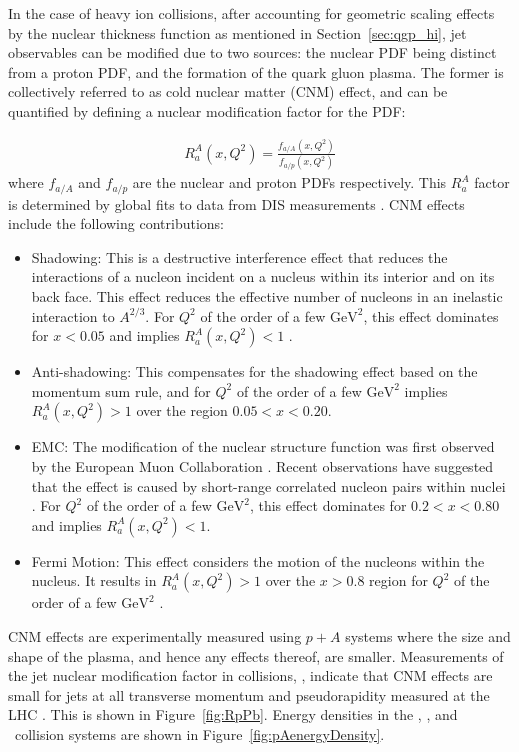 In the case of heavy ion collisions, after accounting for geometric scaling effects by the nuclear thickness function as mentioned in Section~\ref{sec:qgp_hi},  jet observables can be modified due to two sources: the nuclear PDF being distinct from a proton PDF, and the formation of the quark gluon plasma.
The former is collectively referred to as cold nuclear matter (CNM) effect, and can be quantified by defining a nuclear modification factor for the PDF:

\begin{align}
R_a^A (x, Q^2) = \frac{f_{a/A} (x, Q^2)}{f_{a/p}(x, Q^2)}
\end{align}
where $f_{a/A}$ and $f_{a/p}$ are the nuclear and proton PDFs respectively.
This $R_a^A$ factor is determined by global fits to data from DIS measurements \cite{PhysRevC.76.065207, PhysRevD.69.074028, Eskola_2009}.
CNM effects include the following contributions:
\begin{itemize}
\item Shadowing: This is a destructive interference effect that reduces the interactions of a nucleon incident on a nucleus within its interior and on its back face.
This effect reduces the effective number of nucleons in an inelastic interaction to $A^{2/3}$.
For $Q^2$ of the order of a few $\mathrm{GeV}^2$, this effect dominates for $x < 0.05$ and implies $R_a^A (x, Q^2) < 1$  \cite{PhysRevLett.64.1342}.
\item Anti-shadowing: This compensates for the shadowing effect based on the momentum sum rule, and for $Q^2$ of the order of a few $\mathrm{GeV}^2$ implies $R_a^A (x, Q^2) > 1$ over the region $0.05 < x < 0.20$.
\item EMC: The modification of the nuclear structure function was first observed by the European Muon Collaboration \cite{AUBERT1983275}.
Recent observations have suggested that the effect is caused by short-range correlated nucleon pairs within nuclei \cite{PhysRevC.85.047301}.
For $Q^2$ of the order of a few $\mathrm{GeV}^2$, this effect dominates for $0.2 < x < 0.80$ and implies $R_a^A (x, Q^2) < 1$.
\item  Fermi Motion: This effect considers the motion of the nucleons within the nucleus.
It results in $R_a^A (x, Q^2) > 1$  over the $x > 0.8$ region for $Q^2$ of the order of a few $\mathrm{GeV}^2$ \cite{Saito:1985ct}.
\end{itemize}

CNM effects are experimentally measured using $p+A$ systems where the size and shape of the plasma, and hence any effects thereof, are smaller.
Measurements of the jet nuclear modification factor in \pPb collisions, \RpPb, indicate that CNM effects are small for jets at all transverse momentum and pseudorapidity measured at the LHC \cite{2015392, Adam2016, Khachatryan2016b}.
This is shown in Figure~\ref{fig:RpPb}.
Energy densities in the \pbpb, \pPb, and \pp\ collision systems are shown in Figure~\ref{fig:pAenergyDensity}.

